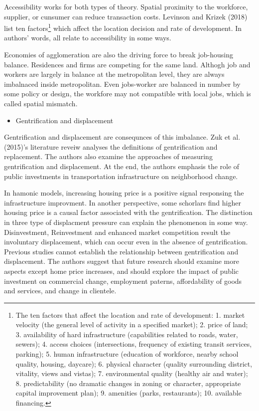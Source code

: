 \documentclass[12pt,]{article}
\providecommand{\tightlist}{%
  \setlength{\itemsep}{0pt}\setlength{\parskip}{0pt}}
\let\rmarkdownfootnote\footnote%
\def\footnote{\protect\rmarkdownfootnote}
\begin{document}
Accessibility works for both types of theory. Spatial proximity to the
workforce, supplier, or cunsumer can reduce transaction costs. Levinson
and Krizek (2018) list ten factors\footnote{The ten factors that affect
  the location and rate of development: 1. market velocity (the general
  level of activity in a specified market); 2. price of land; 3.
  availability of hard infrastructure (capabilities related to roads,
  water, sewers); 4. access choices (intersections, frequency of
  existing transit services, parking); 5. human infrastructure
  (education of workforce, nearby school quality, housing, daycare); 6.
  physical character (quality surrounding district, vitality, views and
  vistas); 7. environmental quality (healthy air and water); 8.
  predictability (no dramatic changes in zoning or character,
  appropriate capital improvement plan); 9. amenities (parks,
  restaurants); 10. available financing.} which affect the location
decision and rate of development. In authors' words, all relate to
accessibility in some ways.

Economies of agglomeration are also the driving force to break
job-housing balance. Residences and firms are competing for the same
land. Althogh job and workers are largely in balance at the metropolitan
level, they are always imbalnaced inside metropolitan. Even jobs-worker
are balanced in number by some policy or design, the workfore may not
compatible with local jobs, which is called spatial mismatch.

\begin{itemize}
\tightlist
\item
  Gentrification and displacement
\end{itemize}

Gentrification and displacement are consequnces of this imbalance. Zuk
et al. (2015)'s literature reveiw analyses the definitions of
gentrification and replacement. The authors also examine the approaches
of measuring gentrification and displacement. At the end, the authors
emphasis the role of public investments in transportation infrastructure
on neighborhood change.

In hamonic models, increasing housing price is a positive signal
responsing the infrastructure improvment. In another perspective, some
schorlars find higher housing price is a causal factor associated with
the gentrification. The distinction in three type of displacment
pressure can explain the phenomenon in some way. Disinvestment,
Reinvestment and enhanced market competition result the involuntary
displacement, which can occur even in the absence of gentrification.
Previous studies cannot establish the relationship between
gentrification and displacement. The authors suggest that future
research should examine more aspects except home price increases, and
should explore the impact of public investment on commercial change,
employment paterns, affordability of goods and services, and change in
clientele.
\end{document}
